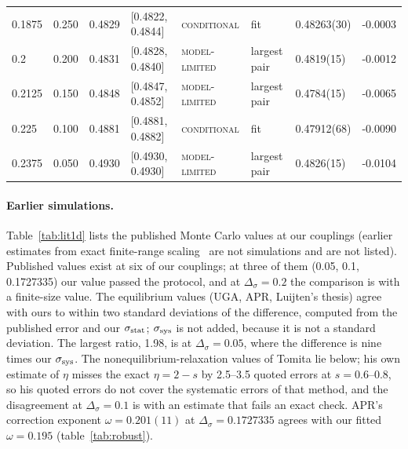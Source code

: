 \documentclass[10pt,a4paper]{article}
\newcommand{\Ds}{\Delta_\sigma}
\newcommand{\lbl}[1]{{\mdseries\scshape #1}}
\newcommand{\sstat}{\sigma_{\rm stat}}
\newcommand{\ssys}{\sigma_{\rm sys}}
\begin{document}
\begin{table}[htbp]
\begin{tabular}{@{}llllllll@{}}
0.1875 & 0.250 & 0.4829 & [0.4822, 0.4844] & \lbl{conditional} & fit & 0.48263(30) & -0.0003 \\
0.2 & 0.200 & 0.4831 & [0.4828, 0.4840] & \lbl{model-limited} & largest pair & 0.4819(15) & -0.0012 \\
0.2125 & 0.150 & 0.4848 & [0.4847, 0.4852] & \lbl{model-limited} & largest pair & 0.4784(15) & -0.0065 \\
0.225 & 0.100 & 0.4881 & [0.4881, 0.4882] & \lbl{conditional} & fit & 0.47912(68) & -0.0090 \\
0.2375 & 0.050 & 0.4930 & [0.4930, 0.4930] & \lbl{model-limited} & largest pair & 0.4826(15) & -0.0104 \\
\bottomrule\end{tabular}
\end{table}

\paragraph{Earlier simulations.} Table~\ref{tab:lit1d} lists the published Monte Carlo values at our couplings (earlier estimates from exact
finite-range scaling~\cite{Glumac:1989fr} are not simulations and are not listed). Published values exist at
six of our couplings; at three of them (0.05, 0.1, 0.1727335) our value passed the protocol, and at $\Ds=0.2$ the comparison is with a finite-size
value. The equilibrium values (UGA, APR, Luijten's thesis) agree with ours to within two standard deviations of the difference, computed from the
published error and our $\sstat$; $\ssys$ is not added, because it is not a standard deviation. The largest ratio, 1.98, is at $\Ds=0.05$,
where the difference is nine times our $\ssys$. The nonequilibrium-relaxation values of Tomita lie below; his own estimate of $\eta$
misses the exact $\eta=2-s$ by 2.5--3.5 quoted errors at $s=0.6$--$0.8$, so his quoted errors do not cover the systematic errors of that
method, and the disagreement at $\Ds=0.1$ is with an estimate that fails an exact check. APR's correction exponent $\omega=0.201(11)$ at
$\Ds=0.1727335$ agrees with our fitted $\omega=0.195$ (table~\ref{tab:robust}).
\end{document}
